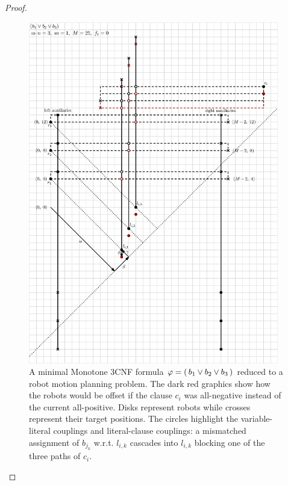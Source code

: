 \begin{proof}
\begin{figure}[h]
	\centering
	\includegraphics[height=15cm]{ipe/np_reduction.eps}
	\caption{
		A minimal Monotone 3CNF formula \(\varphi = (\, b_1 \lor b_2 \lor b_3 \,)\) reduced to a robot motion planning problem. 
		The dark red graphics show how the robots would be offset if the clause \(c_i\) was all-negative instead of the current all-positive. 
		Disks represent robots while crosses represent their target positions. 
		The circles highlight the variable-literal couplings and literal-clause couplings: a mismatched assignment of \(b_{j_k}\) w.r.t. \(l_{i,k}\) cascades into \(l_{i,k}\) blocking one of the three paths of \(c_i\).
	}\label{fig:full_reduction}
\end{figure}







\end{proof}
